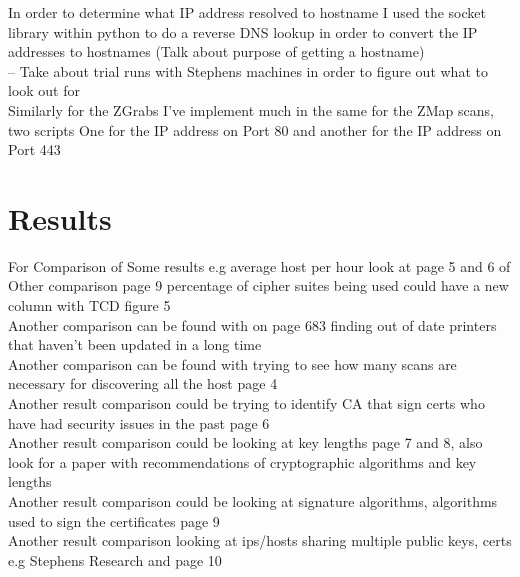 \documentclass[a4wide,leqno,12pt]{report}
\begin{document}
In order to determine what IP address resolved to hostname I used the socket library within python to do a reverse DNS lookup in order to convert the IP addresses to hostnames (Talk about purpose of getting a hostname)\\



-- Take about trial runs with Stephens machines in order to figure out what to look out for\\

Similarly for the ZGrabs I've implement much in the same for the ZMap scans, two scripts One for the IP address on Port 80 and another for the IP address on Port 443


\chapter{Results}

For Comparison of Some results e.g average host per hour look at page 5 and 6 of \cite{durumeric2013zmap}\\

Other comparison \cite{durumeric2015search} page 9 percentage of cipher suites being used could have a new column with TCD figure 5\\

Another comparison can be found with \cite{lee2016implementation} on page 683 finding out of date printers that haven't been updated in a long time\\

Another comparison can be found with trying to see how many scans are necessary for discovering all the host \cite{durumeric2013analysis} page 4\\

Another result comparison could be trying to identify CA that sign certs who have had security issues in the past \cite{durumeric2013analysis} page 6\\

Another result comparison could be looking at key lengths \cite{durumeric2013analysis} page 7 and 8, also look for a paper with recommendations of cryptographic algorithms and key lengths\\

Another result comparison could be looking at signature algorithms, algorithms used to sign the certificates \cite{durumeric2013analysis} page 9\\

Another result comparison looking at ips/hosts sharing multiple public keys, certs e.g Stephens Research and \cite{durumeric2013analysis} page 10\\
\end{document}
